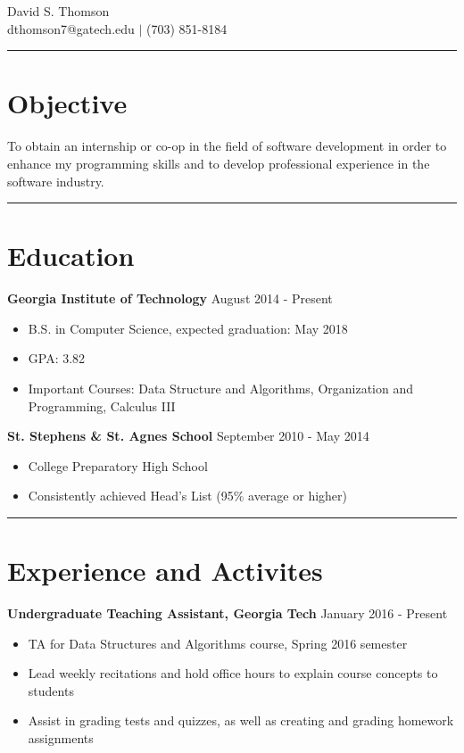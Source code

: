 \documentclass[11pt]{article}
\begin{document}
\begin{center}
{\huge David S. Thomson} \\
\vspace*{1em}
dthomson7@gatech.edu $\vert$ (703) 851-8184
\end{center}

\rule{\textwidth}{.5pt}

\section*{Objective}
To obtain an internship or co-op in the field of software development in order to enhance my programming skills and to develop professional experience in the software industry.

\rule{\textwidth}{.5pt}

\section*{Education}
\textbf{Georgia Institute of Technology} \hfill August 2014 - Present
\begin{itemize}
\setlength\itemsep{0.5pt}
    \item B.S. in Computer Science, expected graduation: May 2018
    \item GPA: 3.82
    \item Important Courses: Data Structure and Algorithms, Organization and Programming, Calculus III %
\end{itemize}

\textbf{St. Stephens \& St. Agnes School} \hfill September 2010 - May 2014
\begin{itemize}
\setlength\itemsep{0.5pt}
    \item College Preparatory High School
    \item Consistently achieved Head's List (95\% average or higher)
\end{itemize}

\rule{\textwidth}{.5pt}

\section*{Experience and Activites}
\textbf{Undergraduate Teaching Assistant, Georgia Tech} \hfill January 2016 - Present
\begin{itemize}
\setlength\itemsep{0.5pt}
    \item TA for Data Structures and Algorithms course, Spring 2016 semester
    \item Lead weekly recitations and hold office hours to explain course concepts to students
    \item Assist in grading tests and quizzes, as well as creating and grading homework assignments
\end{itemize}
\end{document}
